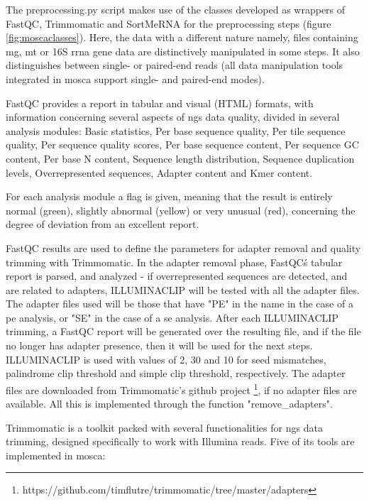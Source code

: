 \documentclass[
  oneside,
  11pt, a4paper,
  footinclude=true,
  headinclude=true,
  cleardoublepage=empty
]{scrbook}
\begin{document}
    The preprocessing.py script makes use of the classes developed as wrappers of FastQC, Trimmomatic and SortMeRNA for the preprocessing steps (figure \ref{fig:moscaclasses}). Here, the data with a different nature namely, files containing \gls{mg}, \gls{mt} or 16S \gls{rrna} gene data are distinctively manipulated in some steps. It also distinguishes between single- or paired-end reads (all data manipulation tools integrated in \gls{mosca} support single- and paired-end modes).
    
    FastQC provides a report in tabular and visual (HTML) formats, with information concerning several aspects of \gls{ngs} data quality, divided in several analysis modules: Basic statistics, Per base sequence quality, Per tile sequence quality, Per sequence quality scores, Per base sequence content, Per sequence GC content, Per base N content, Sequence length distribution, Sequence duplication levels, Overrepresented sequences, Adapter content and Kmer content.
    
    For each analysis module a flag is given, meaning that the result is entirely normal (green), slightly abnormal (yellow) or very unusual (red), concerning the degree of deviation from an excellent report.
    
    FastQC results are used to define the parameters for adapter removal and quality trimming with Trimmomatic. In the adapter removal phase, FastQC\'s tabular report is parsed, and analyzed - if overrepresented sequences are detected, and are related to adapters, ILLUMINACLIP will be tested with all the adapter files. The adapter files used will be those that have "PE" in the name in the case of a \gls{pe} analysis, or "SE" in the case of a \gls{se} analysis. After each ILLUMINACLIP trimming, a FastQC report will be generated over the resulting file, and if the file no longer has adapter presence, then it will be used for the next steps. ILLUMINACLIP is used with values of 2, 30 and 10 for seed mismatches, palindrome clip threshold and simple clip threshold, respectively. The adapter files are downloaded from Trimmomatic's github project \footnote{https://github.com/timflutre/trimmomatic/tree/master/adapters}, if no adapter files are available. All this is implemented through the function "remove\_adapters".
    
    Trimmomatic is a toolkit packed with several functionalities for \gls{ngs} data trimming, designed specifically to work with Illumina reads. Five of its tools are implemented in \gls{mosca}:
    
\end{document}
